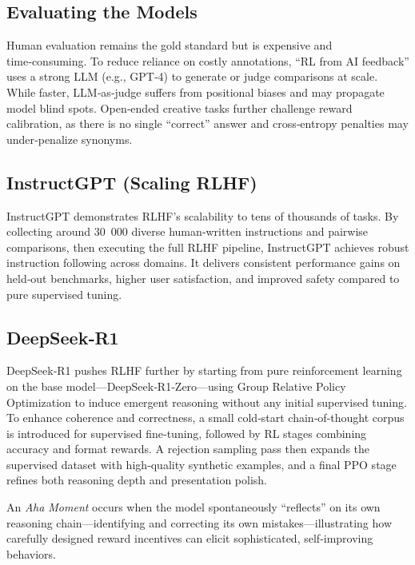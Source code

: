 \documentclass{article}
\begin{document}
\subsection{Evaluating the Models}

Human evaluation remains the gold standard but is expensive and time‑consuming. To reduce reliance on costly annotations, “RL from AI feedback” uses a strong LLM (e.g., GPT‑4) to generate or judge comparisons at scale. While faster, LLM‑as‑judge suffers from positional biases and may propagate model blind spots. Open‑ended creative tasks further challenge reward calibration, as there is no single “correct” answer and cross‑entropy penalties may under‑penalize synonyms.

\subsection{InstructGPT (Scaling RLHF)}

InstructGPT demonstrates RLHF’s scalability to tens of thousands of tasks. By collecting around 30 000 diverse human‑written instructions and pairwise comparisons, then executing the full RLHF pipeline, InstructGPT achieves robust instruction following across domains. It delivers consistent performance gains on held‑out benchmarks, higher user satisfaction, and improved safety compared to pure supervised tuning.

\subsection{DeepSeek‑R1}

DeepSeek‑R1 pushes RLHF further by starting from pure reinforcement learning on the base model—DeepSeek‑R1‑Zero—using Group Relative Policy Optimization to induce emergent reasoning without any initial supervised tuning. To enhance coherence and correctness, a small cold‑start chain‑of‑thought corpus is introduced for supervised fine‑tuning, followed by RL stages combining accuracy and format rewards. A rejection sampling pass then expands the supervised dataset with high‑quality synthetic examples, and a final PPO stage refines both reasoning depth and presentation polish.

An \emph{Aha Moment} occurs when the model spontaneously “reflects” on its own reasoning chain—identifying and correcting its own mistakes—illustrating how carefully designed reward incentives can elicit sophisticated, self‑improving behaviors.
\end{document}
